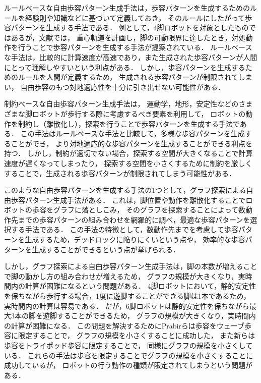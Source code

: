 ルールベースな自由歩容パターン生成手法は，歩容パターンを生成するためのルールを経験則や知識などに基づいて定義しておき，
そのルールにしたがって歩容パターンを生成する手法である．
例として，4脚ロボットを対象としたものではあるが，文献\cite{cita:adati_free_gait}では，
重心軌道を計画し，脚の可動限界に達したとき，対処動作を行うことで歩容パターンを生成する手法が提案されている．
ルールベースな手法は，比較的に計算速度が高速であり，また生成された歩容パターンが人間にとって理解しやすいという利点がある．
しかし，歩容パターンを生成するためのルールを人間が定義するため，
生成される歩容パターンが制限されてしまい，
自由歩容のもつ対地適応性を十分に引き出せない可能性がある．

制約ベースな自由歩容パターン生成手法は，
運動学，地形，安定性などのさまざまな脚ロボットが歩行する際に考慮するべき要素を利用して，
ロボットの動作を制約し（離散化し），探索を行うことで歩容パターンを生成する手法である．
この手法はルールベースな手法と比較して，多様な歩容パターンを生成することができ，
より対地適応的な歩容パターンを生成することができる利点を持つ．
しかし，制約が適切でない場合，探索する空間が大きくなることで計算速度が遅くなってしまったり，
探索する空間を小さくするために制約を厳しくすることで，生成される歩容パターンが制限されてしまう可能性がある．

このような自由歩容パターンを生成する手法の1つとして，グラフ探索による自由歩容パターン生成手法がある\cite{Prabir_Graph_search}．
これは，脚位置や動作を離散化することでロボットの歩容をグラフに落としこみ，
そのグラフを探索することによって数動作先までの歩容パターンの組み合わせを網羅的に調べ，最適な歩容パターンを選択する手法である．
この手法の特徴として，数動作先までを考慮して歩容パターンを生成するため，デッドロックに陥りにくいという点や，
効率的な歩容パターンを生成することができるという点が挙げられる．

しかし，グラフ探索による自由歩容パターン生成手法は，脚の本数が増えることで脚の動かし方の組み合わせが増えるため，
グラフの規模が大きくなり，実時間内の計算が困難になるという問題がある．
4脚ロボットにおいて，静的安定性を保ちながら歩行する場合，1度に遊脚することができる脚は1本であるため，
実時間内の計算は容易である．
だが，6脚ロボットは静的安定性を保ちながら最大3本の脚を遊脚することができるため，
グラフの規模が大きくなり，実時間内の計算が困難になる．
この問題を解決するためにPrabirらは歩容をウェーブ歩容に限定することで，
グラフの規模を小さくすることに成功した\cite{Prabir_Graph_search_Six}，
また新らは歩容をトライポッド歩容に限定することで\cite{Arata_Graph_search_Six}，
同様にグラフの規模を小さくしている．
これらの手法は歩容を限定することでグラフの規模を小さくすることに成功しているが，
ロボットの行う動作の種類が限定されてしまうという問題がある．

